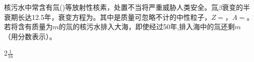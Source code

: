核污水中常含有氚()等放射性核素，处置不当将严重威胁人类安全。氚\(\beta\)衰变的半衰期长达12.5年，衰变方程为。其中是质量可忽略不计的中性粒子，$Z=$\lunl{3em}，$A=$\lunl{3em}。若将含有质量为$m$的氚的核污水排入大海，即使经过50年,排入海中的氚还剩\lunl{3em}$m$（用分数表示）。
\begin{answer}
    2\quad \(\frac{1}{16}\)
\end{answer}
